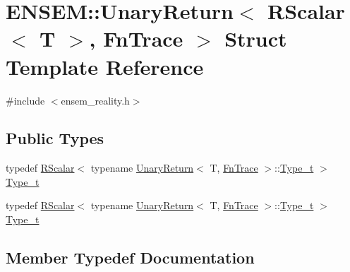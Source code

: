 \hypertarget{structENSEM_1_1UnaryReturn_3_01RScalar_3_01T_01_4_00_01FnTrace_01_4}{}\section{E\+N\+S\+EM\+:\+:Unary\+Return$<$ R\+Scalar$<$ T $>$, Fn\+Trace $>$ Struct Template Reference}
\label{structENSEM_1_1UnaryReturn_3_01RScalar_3_01T_01_4_00_01FnTrace_01_4}


{\ttfamily \#include $<$ensem\+\_\+reality.\+h$>$}

\subsection*{Public Types}
\begin{DoxyCompactItemize}
\item 
typedef \mbox{\hyperlink{classENSEM_1_1RScalar}{R\+Scalar}}$<$ typename \mbox{\hyperlink{structENSEM_1_1UnaryReturn}{Unary\+Return}}$<$ T, \mbox{\hyperlink{structENSEM_1_1FnTrace}{Fn\+Trace}} $>$\+::\mbox{\hyperlink{structENSEM_1_1UnaryReturn_3_01RScalar_3_01T_01_4_00_01FnTrace_01_4_a1fbf2ac97cda49c4f5347aa1df4559aa}{Type\+\_\+t}} $>$ \mbox{\hyperlink{structENSEM_1_1UnaryReturn_3_01RScalar_3_01T_01_4_00_01FnTrace_01_4_a1fbf2ac97cda49c4f5347aa1df4559aa}{Type\+\_\+t}}
\item 
typedef \mbox{\hyperlink{classENSEM_1_1RScalar}{R\+Scalar}}$<$ typename \mbox{\hyperlink{structENSEM_1_1UnaryReturn}{Unary\+Return}}$<$ T, \mbox{\hyperlink{structENSEM_1_1FnTrace}{Fn\+Trace}} $>$\+::\mbox{\hyperlink{structENSEM_1_1UnaryReturn_3_01RScalar_3_01T_01_4_00_01FnTrace_01_4_a1fbf2ac97cda49c4f5347aa1df4559aa}{Type\+\_\+t}} $>$ \mbox{\hyperlink{structENSEM_1_1UnaryReturn_3_01RScalar_3_01T_01_4_00_01FnTrace_01_4_a1fbf2ac97cda49c4f5347aa1df4559aa}{Type\+\_\+t}}
\end{DoxyCompactItemize}


\subsection{Member Typedef Documentation}
\mbox{\label{structENSEM_1_1UnaryReturn_3_01RScalar_3_01T_01_4_00_01FnTrace_01_4_a1fbf2ac97cda49c4f5347aa1df4559aa}} 
